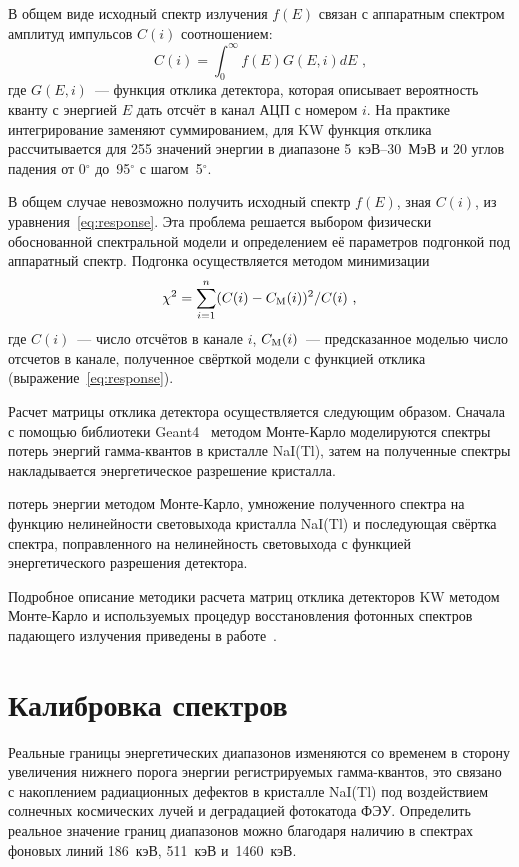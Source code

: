 В общем виде исходный спектр излучения $f(E)$ связан с аппаратным спектром амплитуд 
импульсов $C(i)$ соотношением:
\begin{equation}\label{eq:response}
    C(i)=\int_{0}^{\infty} f(E)G(E,i) dE \mbox{ ,}
\end{equation}
где $G(E,i)$~--- функция отклика детектора, которая описывает вероятность кванту 
с энергией $E$ дать отсчёт в канал АЦП с номером $i$. На практике интегрирование 
заменяют суммированием, для KW функция отклика рассчитывается для 255 
значений энергии в диапазоне 5~кэВ--30~МэВ и 20 углов падения 
от 0$^\circ$ до~95$^\circ$ с шагом~5$^\circ$.

В общем случае невозможно получить исходный спектр $f(E)$, зная $C(i)$, из 
уравнения~\ref{eq:response}.  Эта проблема решается выбором физически обоснованной 
спектральной модели и определением её параметров подгонкой под аппаратный спектр. 
Подгонка осуществляется методом минимизации
\begin{equation}\label{eq:chisq}
    \chi^2=\sum\limits_{i=1}^n(C(i)-C_{\mathrm{M}}(i))^2/C(i) \mbox{ ,}
\end{equation}
где $C(i)$~--- число отсчётов в канале $i$, $C_{\mathrm{M}}(i)$~--- предсказанное моделью число отсчетов в канале, 
полученное свёрткой модели с функцией отклика (выражение~\ref{eq:response}).

Расчет матрицы отклика детектора осуществляется следующим образом.
Сначала с помощью библиотеки Geant4~\citep{GEANT4_2003NIMPA} методом Монте-Карло 
моделируются спектры потерь энергий гамма-квантов в кристалле NaI(Tl), затем на 
полученные спектры накладывается энергетическое разрешение кристалла.

потерь энергии методом Монте-Карло, умножение полученного спектра на функцию 
нелинейности световыхода кристалла NaI(Tl) и последующая свёртка спектра, 
поправленного на нелинейность световыхода с функцией энергетического разрешения 
детектора.

Подробное описание методики расчета матриц отклика детекторов KW методом Монте-Карло 
и используемых процедур восстановления фотонных спектров падающего излучения 
приведены в работе~\citep{Terekhov_1998AIPC}.

\section{Калибровка спектров}
Реальные границы энергетических диапазонов изменяются со временем в сторону 
увеличения нижнего порога энергии регистрируемых гамма-квантов, это  
связано с накоплением радиационных дефектов в кристалле NaI(Tl) под воздействием 
солнечных космических лучей и деградацией фотокатода ФЭУ. Определить реальное значение 
границ диапазонов можно благодаря наличию в спектрах фоновых линий 186~кэВ, 511~кэВ и~1460~кэВ.

